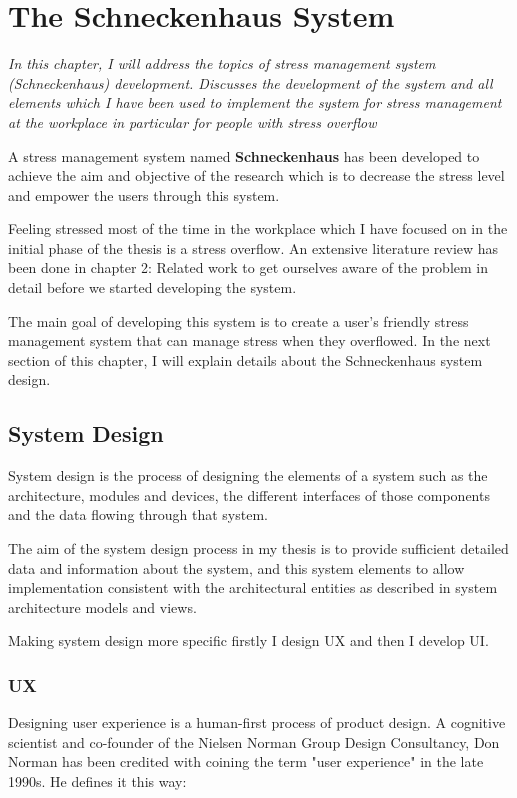 \chapter{The Schneckenhaus System}
\textit{In this chapter, I will address the topics of stress management system (Schneckenhaus) development. Discusses the development of the system and all elements which I have been used to implement the system for stress management at the  workplace  in  particular  for people with stress overflow}
\vspace{5mm}

A stress management system named \textbf{Schneckenhaus} has been developed to achieve the aim and objective of the research which is to decrease the stress level and empower the users through this system. 

Feeling stressed most of the time in the workplace which I have focused on in the initial phase of the thesis is a stress overflow. An extensive literature review has been done in chapter 2: Related work to get ourselves aware of the problem in detail before we started developing the system.

The main goal of developing this system is to create a user's friendly stress management system that can manage stress when they overflowed. In the next section of this chapter, I will explain details about the Schneckenhaus system design.

\section{System Design}
System design is the process of designing the elements of a system such as the architecture, modules and devices, the different interfaces of those components and the data flowing through that system. 

The aim of the system design process in my thesis is to provide sufficient detailed data and information about the system, and this system elements to allow implementation consistent with the architectural entities as described in system architecture models and views.

Making system design more specific firstly I design \acf{UX} and then I develop \acf{UI}.
\subsection*{\acf{UX}}
Designing user experience is a human-first process of product design. A cognitive scientist and co-founder of the Nielsen Norman Group Design Consultancy, Don Norman has been credited with coining the term "user experience" in the late 1990s. He defines it this way:

